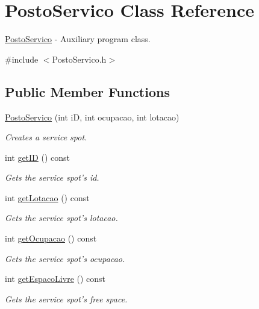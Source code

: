 \hypertarget{class_posto_servico}{\section{Posto\+Servico Class Reference}
\label{class_posto_servico}
}


\hyperlink{class_posto_servico}{Posto\+Servico} -\/ Auxiliary program class.  




{\ttfamily \#include $<$Posto\+Servico.\+h$>$}

\subsection*{Public Member Functions}
\begin{DoxyCompactItemize}
\item 
\hyperlink{class_posto_servico_a53b6ddb92aebadb5168570cbf9f87bae}{Posto\+Servico} (int i\+D, int ocupacao, int lotacao)
\begin{DoxyCompactList}\small\item\em Creates a service spot. \end{DoxyCompactList}\item 
int \hyperlink{class_posto_servico_a12d2e1c64b373009aec51fb7f4df44ec}{get\+I\+D} () const 
\begin{DoxyCompactList}\small\item\em Gets the service spot's id. \end{DoxyCompactList}\item 
int \hyperlink{class_posto_servico_a467b1b77cd1a56131f0e5a6776a55885}{get\+Lotacao} () const 
\begin{DoxyCompactList}\small\item\em Gets the service spot's lotacao. \end{DoxyCompactList}\item 
int \hyperlink{class_posto_servico_a2f09c305c18b3c08686a852e2e8702ac}{get\+Ocupacao} () const 
\begin{DoxyCompactList}\small\item\em Gets the service spot's ocupacao. \end{DoxyCompactList}\item 
int \hyperlink{class_posto_servico_a9efdef3b0af8965d366dacb6e61bb6d9}{get\+Espaco\+Livre} () const 
\begin{DoxyCompactList}\small\item\em Gets the service spot's free space. \end{DoxyCompactList}\item 

\end{DoxyCompactItemize}
